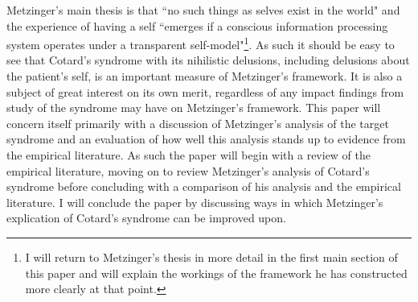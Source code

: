 Metzinger's main thesis is that ``no such things as selves exist in the world" \cite[p. 1]{metzinger2003} and the experience of having a self ``emerges if a conscious information processing system operates under a transparent self-model"\footnote{I will return to Metzinger’s thesis in more detail in the first main section of this paper and will explain the workings of the framework he has constructed more clearly at that point.}. As such it should be easy to see that Cotard's syndrome with its nihilistic delusions, including delusions about the patient's self, is an important measure of Metzinger's framework. It is also a subject of great interest on its own merit, regardless of any impact findings from study of the syndrome may have on Metzinger's framework.
This paper will concern itself primarily with a discussion of Metzinger's analysis of the target syndrome and an evaluation of how well this analysis stands up to evidence from the empirical literature. As such the paper will begin with a review of the empirical literature, moving on to review Metzinger's analysis of Cotard's syndrome before concluding with a comparison of his analysis and the empirical literature. I will conclude the paper by discussing ways in which Metzinger's explication of Cotard's syndrome can be improved upon.

